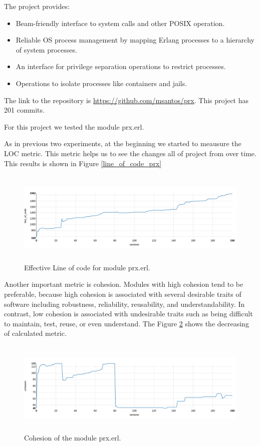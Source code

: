 The project provides:

\begin{itemize}
	\item Beam-friendly interface to system calls and other POSIX operation.
	\item Reliable OS process management by mapping Erlang processes to a hierarchy of system processes.
	\item An interface for privilege separation operations to restrict processes.
	\item Operations to isolate processes like containers and jails.
\end{itemize}


The link to the repository is \url{https://github.com/msantos/prx}. This project has 201 commits. 

For this project we tested the module prx.erl. 

As in previous two experiments, at the beginning we started to meausure the LOC metric. This metric helps us to see the changes all of project from over time. This results is shown in Figure \ref{line_of_code_prx} 

\begin{figure}[h]
	\centering
	\includegraphics[height=45mm]{figures/line_of_code_prx.png}
	\caption{Effective Line of code for module prx.erl.}
	\label{fig:line_of_code_prx}
\end{figure}

Another important metric is cohesion. Modules with high cohesion tend to be preferable, because high cohesion is associated with several desirable traits of software including robustness, reliability, reusability, and understandability. In contrast, low cohesion is associated with undesirable traits such as being difficult to maintain, test, reuse, or even understand. 
The Figure \ref{fig:cohesion_prx} shows the decreasing of calculated metric.

\begin{figure}[h]
	\centering
	\includegraphics[height=45mm]{figures/cohesion_prx.png}
	\caption{Cohesion of the module prx.erl.}
	\label{fig:cohesion_prx}
\end{figure}


